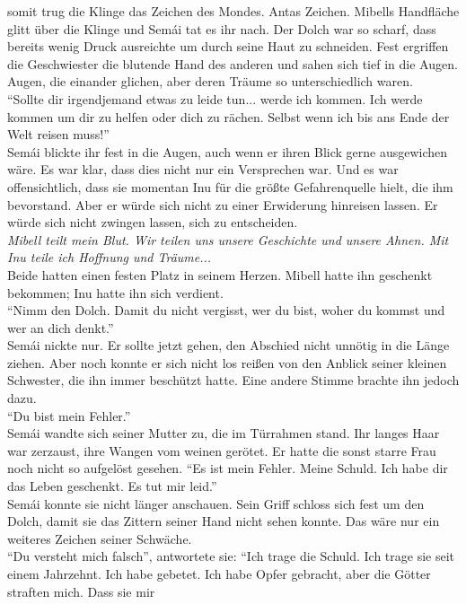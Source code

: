 somit trug die Klinge das Zeichen des Mondes. Antas Zeichen. Mibells Handfläche glitt über die 
Klinge und Semái tat es ihr nach. Der Dolch war so scharf, dass bereits wenig Druck ausreichte um 
durch seine Haut zu schneiden. Fest ergriffen die Geschwiester die blutende Hand des anderen und 
sahen sich tief in die Augen. Augen, die einander glichen, aber deren Träume so 
unterschiedlich waren. \\
``Sollte dir irgendjemand etwas zu leide tun... werde ich kommen. Ich werde kommen um dir zu helfen 
oder dich zu rächen. Selbst wenn ich bis ans Ende der Welt reisen muss!''\\
Semái blickte ihr fest in die Augen, auch wenn er ihren Blick gerne ausgewichen wäre. Es war klar, 
dass dies nicht nur ein Versprechen war. Und es war offensichtlich, dass sie momentan Inu für die 
größte Gefahrenquelle hielt, die ihm bevorstand. Aber er würde sich nicht zu einer Erwiderung 
hinreisen lassen. Er würde sich nicht zwingen lassen, sich zu entscheiden. \\
\textit{Mibell teilt mein Blut. Wir teilen uns unsere Geschichte und unsere Ahnen. Mit Inu teile 
ich Hoffnung und Träume...}\\
Beide hatten einen festen Platz in seinem Herzen. Mibell hatte ihn geschenkt bekommen; Inu hatte 
ihn sich verdient. \\
``Nimm den Dolch. Damit du nicht vergisst, wer du bist, woher du kommst und wer an dich denkt.''\\
Semái nickte nur. Er sollte jetzt gehen, den Abschied nicht unnötig in die Länge ziehen. Aber noch 
konnte er sich nicht los reißen von den Anblick seiner kleinen Schwester, die ihn immer beschützt 
hatte. Eine andere Stimme brachte ihn jedoch dazu.\\
``Du bist mein Fehler.''\\
Semái wandte sich seiner Mutter zu, die im Türrahmen stand. Ihr langes Haar war zerzaust, ihre 
Wangen vom weinen gerötet. Er hatte die sonst starre Frau noch nicht so aufgelöst gesehen. ``Es ist 
mein Fehler. Meine Schuld. Ich habe dir das Leben geschenkt. Es tut mir leid.''\\
Semái konnte sie nicht länger anschauen. Sein Griff schloss sich fest um den Dolch, damit sie das 
Zittern seiner Hand nicht sehen konnte. Das wäre nur ein weiteres Zeichen seiner Schwäche. \\
``Du versteht mich falsch'', antwortete sie: ``Ich trage die Schuld. Ich trage sie seit einem 
Jahrzehnt. Ich habe gebetet. Ich habe Opfer gebracht, aber die Götter straften mich. Dass sie mir 
